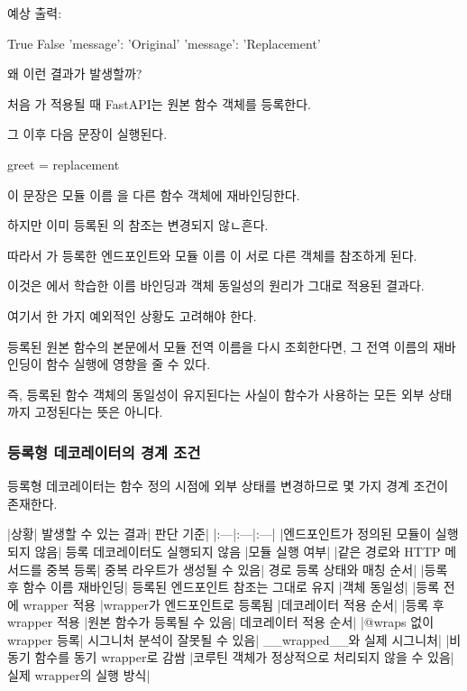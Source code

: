 예상 출력:

\begin{dhkzsh}
True
False
{'message': 'Original'}
{'message': 'Replacement'}
\end{dhkzsh}

왜 이런 결과가 발생할까?

처음 가 적용될 때 FastAPI는 원본  함수 객체를 등록한다.

그 이후 다음 문장이 실행된다.

\begin{dhkcode}
greet = replacement
\end{dhkcode}

이 문장은 모듈 이름 을 다른 함수 객체에 재바인딩한다.

하지만 이미 등록된 의 참조는 변경되지 않ㄴ흔다.

따라서 가 등록한 엔드포인트와 모듈 이름 이 서로 다른 객체를 참조하게 된다.

이것은 에서 학습한 이름 바인딩과 객체 동일성의 원리가 그대로 적용된 결과다.

여기서 한 가지 예외적인 상황도 고려해야 한다.

등록된 원본 함수의 본문에서 모듈 전역 이름을 다시 조회한다면, 그 전역 이름의 재바인딩이 함수 실행에 영향을 줄 수 있다.

즉, 등록된 함수 객체의 동일성이 유지된다는 사실이 함수가 사용하는 모든 외부 상태까지 고정된다는 뜻은 아니다.

\subsubsection{등록형 데코레이터의 경계 조건}

등록형 데코레이터는 함수 정의 시점에 외부 상태를 변경하므로 몇 가지 경계 조건이 존재한다.

\begin{dhktable}
|상황|	발생할 수 있는 결과|	판단 기준|
|:---|:---|:---|
|엔드포인트가 정의된 모듈이 실행되지 않음|	등록 데코레이터도 실행되지 않음	|모듈 실행 여부|
|같은 경로와 HTTP 메서드를 중복 등록|	중복 라우트가 생성될 수 있음|	경로 등록 상태와 매칭 순서|
|등록 후 함수 이름 재바인딩|	등록된 엔드포인트 참조는 그대로 유지	|객체 동일성|
|등록 전에 wrapper 적용	|wrapper가 엔드포인트로 등록됨	|데코레이터 적용 순서|
|등록 후 wrapper 적용	|원본 함수가 등록될 수 있음|	데코레이터 적용 순서|
|@wraps 없이 wrapper 등록|	시그니처 분석이 잘못될 수 있음|	__wrapped__와 실제 시그니처|
|비동기 함수를 동기 wrapper로 감쌈	|코루틴 객체가 정상적으로 처리되지 않을 수 있음|	실제 wrapper의 실행 방식|
\end{dhktable}

